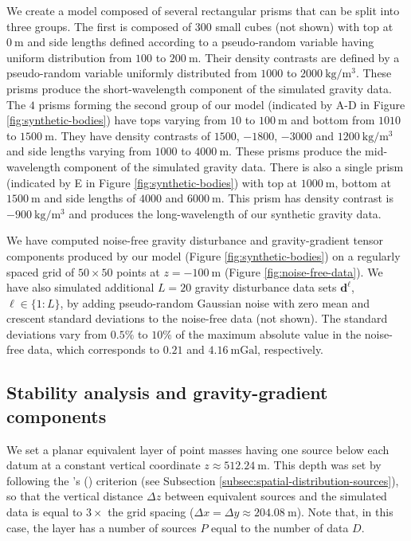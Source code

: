 \documentclass[utf8]{FrontiersinHarvard} %
\begin{document}
	We create a model composed of several rectangular prisms that can be split into three groups.
	The first is composed of $300$ small cubes (not shown) with top at $0 \: \mathrm{m}$ and side lengths
	defined according to a pseudo-random variable having uniform distribution from 
	$100$ to $200 \: \mathrm{m}$.
	Their density contrasts are defined by a pseudo-random variable uniformly distributed
	from $1000$ to $2000 \: \mathrm{kg / m^{3}}$.
	These prisms produce the short-wavelength component of the simulated gravity data.
	The $4$ prisms forming the second group of our model (indicated by A-D in Figure \ref{fig:synthetic-bodies}) 
	have tops varying from $10$ to $100 \: \mathrm{m}$ and bottom from $1010$ to $1500 \: \mathrm{m}$.
	They have density contrasts of $1500$, $-1800$, $-3000$ and $1200  \: \mathrm{kg / m^{3}}$
	and side lengths varying from $1000$ to $4000 \: \mathrm{m}$.
	These prisms produce the mid-wavelength component of the simulated gravity data.
	There is also a single prism (indicated by E in Figure \ref{fig:synthetic-bodies}) 
	with top at $1000 \: \mathrm{m}$, bottom at 
	$1500 \: \mathrm{m}$ and side lengths of $4000$ and $6000 \: \mathrm{m}$.
	This prism has density contrast is $-900 \: \mathrm{kg / m^{3}}$ and produces the
	long-wavelength of our synthetic gravity data.
	
	We have computed noise-free gravity disturbance and gravity-gradient tensor components 
	produced by our model (Figure \ref{fig:synthetic-bodies}) on a regularly spaced grid of $50 \times 50$ points at 
	$z = -100 \: \mathrm{m}$ (Figure \ref{fig:noise-free-data}).
	We have also simulated additional $L = 20$ gravity disturbance data sets $\mathbf{d}^{\ell}$, $\ell \in \{1:L\}$, 
	by adding pseudo-random Gaussian noise with zero mean and crescent standard deviations to the noise-free data (not shown).
	The standard deviations vary from $0.5\%$ to $10\%$ of the maximum absolute value in the noise-free data,
	which corresponds to $0.21$ and $4.16 \: \mathrm{mGal}$, respectively.
	
	\subsection{Stability analysis and gravity-gradient components}
	
	We set a planar equivalent layer of point masses having one source below each datum at a constant vertical coordinate $z \approx 512.24 \: \mathrm{m}$.
	This depth was set by following the \citeauthor{dampney1969}'s (\citeyear{dampney1969}) criterion (see Subsection \ref{subsec:spatial-distribution-sources}),
	so that the vertical distance $\Delta z$ between equivalent sources and the simulated data is equal to $3 \times$ the grid spacing 
	($\Delta x = \Delta y \approx 204.08 \: \mathrm{m} $).
	Note that, in this case, the layer has a number of sources $P$ equal to the number of data $D$.
	
\end{document}
